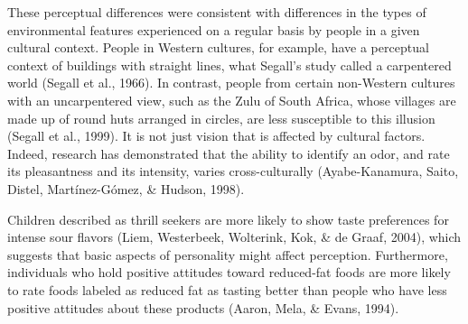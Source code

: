 These perceptual differences were consistent with differences in the types of environmental features experienced on a regular basis by people in a given cultural context. People in Western cultures, for example, have a perceptual context of buildings with straight lines, what Segall’s study called a carpentered world (Segall et al., 1966). In contrast, people from certain non-Western cultures with an uncarpentered view, such as the Zulu of South Africa, whose villages are made up of round huts arranged in circles, are less susceptible to this illusion (Segall et al., 1999). It is not just vision that is affected by cultural factors. Indeed, research has demonstrated that the ability to identify an odor, and rate its pleasantness and its intensity, varies cross-culturally (Ayabe-Kanamura, Saito, Distel, Martínez-G\'{o}mez, \& Hudson, 1998).

Children described as thrill seekers are more likely to show taste preferences for intense sour flavors (Liem, Westerbeek, Wolterink, Kok, \& de Graaf, 2004), which suggests that basic aspects of personality might affect perception. Furthermore, individuals who hold positive attitudes toward reduced-fat foods are more likely to rate foods labeled as reduced fat as tasting better than people who have less positive attitudes about these products (Aaron, Mela, \& Evans, 1994).
\newpage